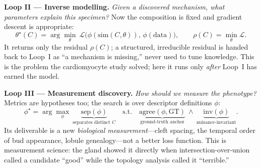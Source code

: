 \documentclass[11pt]{article}
\begin{document}
\textbf{Loop II --- Inverse modelling.} \emph{Given a discovered mechanism, what parameters explain this specimen?} Now the composition is fixed and gradient descent is appropriate:
\[
\theta^\star(C)=\arg\min_{\theta}\ \mathcal{L}\big(\phi(\mathrm{sim}(C,\theta)),\,\phi(\text{data})\big),
\qquad \rho(C)=\min_{\theta}\mathcal{L} .
\]
It returns only the residual $\rho(C)$; a structured, irreducible residual is handed back to Loop~I as ``a mechanism is missing,'' never used to tune knowledge. This is the problem the cardiomyocyte study solved; here it runs only \emph{after} Loop~I has earned the model.

\textbf{Loop III --- Measurement discovery.} \emph{How should we measure the phenotype?} Metrics are hypotheses too; the search is over descriptor definitions $\phi$:
\[
\phi^\star=\arg\max_{\phi}\ \underbrace{\mathrm{sep}(\phi)}_{\text{separates distinct }C}
\quad\text{s.t.}\quad
\underbrace{\mathrm{agree}(\phi,\text{GT})}_{\text{ground-truth anchor}}\ \wedge\
\underbrace{\mathrm{inv}(\phi)}_{\text{nuisance-invariant}} .
\]
Its deliverable is a new \emph{biological measurement}---cleft spacing, the temporal order of bud appearance, lobule genealogy---not a better loss function. This is measurement science: the gland showed it directly when intersection-over-union called a candidate ``good'' while the topology analysis called it ``terrible.''
\end{document}
